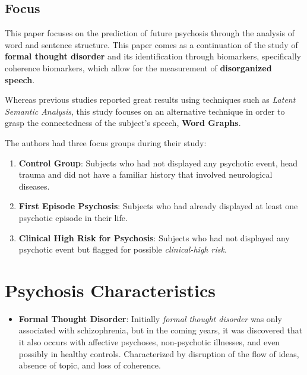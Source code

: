 \documentclass{Paper_Summary}
\begin{document}
\makepapertitle

\breakline

\begin{center}
    \section*{Focus}
\end{center}

    This paper focuses on the prediction of future psychosis through the analysis of word and sentence structure. This paper comes as a continuation of the study of \textbf{formal thought disorder} and its identification through biomarkers, specifically coherence biomarkers, which allow for the measurement of \textbf{disorganized speech}.

    Whereas previous studies reported great results using techniques such as \emph{Latent Semantic Analysis}, this study focuses on an alternative technique in order to grasp the connectedness of the subject's speech, \textbf{Word Graphs}.

    The authors had three focus groups during their study:
    \begin{enumerate}
        \item \textbf{Control Group}: Subjects who had not displayed any psychotic event, head trauma and did not have a familiar history that involved neurological diseases.
        \item \textbf{First Episode Psychosis}: Subjects who had already displayed at least one psychotic episode in their life.
        \item \textbf{Clinical High Risk for Psychosis}: Subjects who had not displayed any psychotic event but flagged for possible \emph{clinical-high risk}.
    \end{enumerate}

\breakline

\newpage

\section{Psychosis Characteristics}
    \begin{itemize}
        \item \textbf{Formal Thought Disorder}: Initially \emph{formal thought disorder} was only associated with schizophrenia, but in the coming years, it was discovered that it also occurs with affective psychoses, non-psychotic illnesses, and even possibly in healthy controls. Characterized by disruption of the flow of ideas, absence of topic, and loss of coherence.
    \end{itemize}
\end{document}
